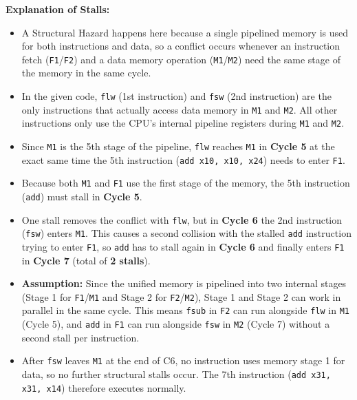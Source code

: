 \documentclass[11pt, a4paper]{article}
\begin{document}
\newpage
\textbf{Explanation of Stalls:}
\begin{itemize}[noitemsep, topsep=2pt]
    \item A Structural Hazard happens here because a single pipelined memory is used for both instructions and data, so a conflict occurs whenever an instruction fetch (\texttt{F1}/\texttt{F2}) and a data memory operation (\texttt{M1}/\texttt{M2}) need the same stage of the memory in the same cycle.
    \item In the given code, \texttt{flw} (1st instruction) and \texttt{fsw} (2nd instruction) are the only instructions that actually access data memory in \texttt{M1} and \texttt{M2}. All other instructions only use the CPU's internal pipeline registers during \texttt{M1} and \texttt{M2}.
    \item Since \texttt{M1} is the 5th stage of the pipeline, \texttt{flw} reaches \texttt{M1} in \textbf{Cycle 5} at the exact same time the 5th instruction (\texttt{add x10, x10, x24}) needs to enter \texttt{F1}.
    \item Because both \texttt{M1} and \texttt{F1} use the first stage of the memory, the 5th instruction (\texttt{add}) must stall in \textbf{Cycle 5}.
    \item One stall removes the conflict with \texttt{flw}, but in \textbf{Cycle 6} the 2nd instruction (\texttt{fsw}) enters \texttt{M1}. This causes a second collision with the stalled \texttt{add} instruction trying to enter \texttt{F1}, so \texttt{add} has to stall again in \textbf{Cycle 6} and finally enters \texttt{F1} in \textbf{Cycle 7} (total of \textbf{2 stalls}).
    \item \textbf{Assumption:} Since the unified memory is pipelined into two internal stages (Stage 1 for \texttt{F1}/\texttt{M1} and Stage 2 for \texttt{F2}/\texttt{M2}), Stage 1 and Stage 2 can work in parallel in the same cycle. This means \texttt{fsub} in \texttt{F2} can run alongside \texttt{flw} in \texttt{M1} (Cycle 5), and \texttt{add} in \texttt{F1} can run alongside \texttt{fsw} in \texttt{M2} (Cycle 7) without a second stall per instruction.
    \item After \texttt{fsw} leaves \texttt{M1} at the end of C6, no instruction uses memory stage 1 for data, so no further structural stalls occur. The 7th instruction (\texttt{add x31, x31, x14}) therefore executes normally.
\end{itemize}
\end{document}
